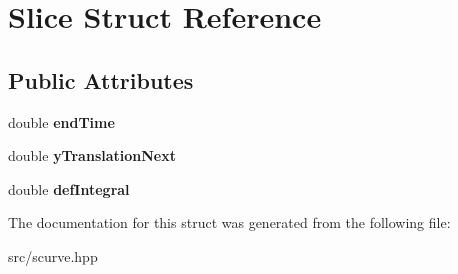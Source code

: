 \hypertarget{structSlice}{}\section{Slice Struct Reference}
\label{structSlice}
\subsection*{Public Attributes}
\begin{DoxyCompactItemize}
\item 
\mbox{\label{structSlice_adfcca7658989ebb2c0faf1148813709c}} 
double {\bfseries end\+Time}
\item 
\mbox{\label{structSlice_ae012273ef688ac6d5333f48f385a0b0c}} 
double {\bfseries y\+Translation\+Next}
\item 
\mbox{\label{structSlice_a3ada29863e849be4433e63c832353f36}} 
double {\bfseries def\+Integral}
\end{DoxyCompactItemize}


The documentation for this struct was generated from the following file\+:\begin{DoxyCompactItemize}
\item 
src/scurve.\+hpp\end{DoxyCompactItemize}
